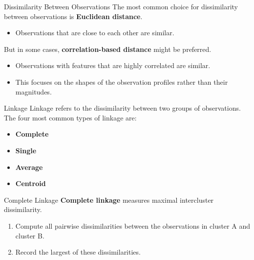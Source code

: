 \documentclass[
  ignorenonframetext,
  aspectratio=169,
]{beamer}
\providecommand{\tightlist}{%
  \setlength{\itemsep}{0pt}\setlength{\parskip}{0pt}}\usepackage{longtable,booktabs,array}
\begin{document}
\begin{frame}{Dissimilarity Between Observations}
\protect\hypertarget{dissimilarity-between-observations}{}
The most common choice for dissimilarity between observations is
\textbf{Euclidean distance}.

\begin{itemize}
\tightlist
\item
  Observations that are close to each other are similar.
\end{itemize}

But in some cases, \textbf{correlation-based distance} might be
preferred.

\begin{itemize}
\item
  Observations with features that are highly correlated are similar.
\item
  This focuses on the shapes of the observation profiles rather than
  their magnitudes.
\end{itemize}
\end{frame}

\begin{frame}{Linkage}
\protect\hypertarget{linkage}{}
Linkage refers to the dissimilarity between two groups of observations.
The four most common types of linkage are:

\begin{itemize}
\item
  \textbf{Complete}
\item
  \textbf{Single}
\item
  \textbf{Average}
\item
  \textbf{Centroid}
\end{itemize}
\end{frame}

\begin{frame}{Complete Linkage}
\protect\hypertarget{complete-linkage}{}
\textbf{Complete linkage} measures maximal intercluster dissimilarity.

\begin{block}{\quad}
\protect\hypertarget{section}{}
\begin{enumerate}
\item
  Compute all pairwise dissimilarities between the observations in
  cluster A and cluster B.
\item
  Record the largest of these dissimilarities.
\end{enumerate}
\end{block}
\end{frame}
\end{document}
